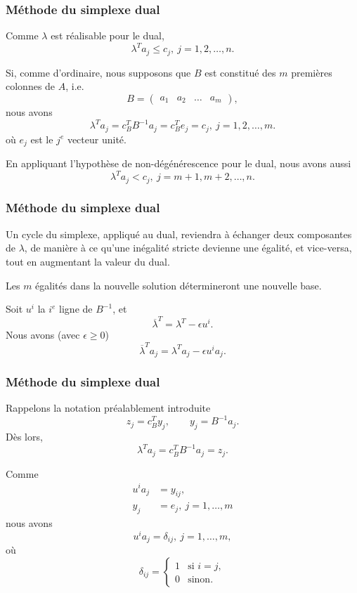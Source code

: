 \documentclass[usepdftitle=false]{beamer}
\begin{document}
\begin{frame}
	\frametitle{Méthode du simplexe dual}
	
	Comme $\lambda$ est réalisable pour le dual,
	\[
	\lambda^T a_j \leq c_j,\ j = 1, 2, \ldots, n.
	\]
	
	\mbox{}
	
	Si, comme d'ordinaire, nous supposons que $B$ est constitué des $m$ premières colonnes de $A$, i.e.
	\[
	B = \begin{pmatrix}
		a_1 & a_2 & \ldots & a_m
	\end{pmatrix},
	\]
	nous avons
	\[
	\lambda^T a_j = c_B^T B^{-1} a_j = c_B^T e_j = c_j,\ j = 1, 2, \ldots, m.
	\]
	où $e_j$ est le $j^e$ vecteur unité.
	
	\mbox{}
	
	En appliquant l'hypothèse de non-dégénérescence pour le dual, nous avons aussi
	\[
	\lambda^T a_j < c_j,\ j = m+1, m+2, \ldots, n.
	\]
	
\end{frame}

\begin{frame}
	\frametitle{Méthode du simplexe dual}
	
	Un cycle du simplexe, appliqué au dual, reviendra à échanger deux composantes de $\lambda$, de manière à ce qu'une inégalité stricte devienne une égalité, et vice-versa, tout en augmentant la valeur du dual.
	
	\mbox{}
	
	Les $m$ égalités dans la nouvelle solution détermineront une nouvelle base.
	
	\mbox{}
	
	Soit $u^i$ la $i^e$ ligne de $B^{-1}$, et
	\[
	\overline{\lambda}^T = \lambda^T - \epsilon u^i.
	\]
	Nous avons (avec $\epsilon \geq 0$)
	\[
	\overline{\lambda}^T a_j = \lambda^T a_j - \epsilon u^i a_j.
	\]
	
\end{frame}

\begin{frame}
	\frametitle{Méthode du simplexe dual}
	
	Rappelons la notation préalablement introduite
	\[
	z_j = c_B^T y_j,\qquad y_j = B^{-1}a_j.
	\]
	Dès lors,
	\[
	\lambda^T a_j = c_B^T B^{-1} a_j = z_j.
	\]
	
	\mbox{}
	
	Comme
	\begin{align*}
		u^i a_j &= y_{ij},\\
		y_j &= e_j,\ j = 1,\ldots,m
	\end{align*}
	nous avons
	\[
	u^i a_j = \delta_{ij},\ j = 1,\ldots,m,
	\]
	où
	\[
	\delta_{ij} =
	\begin{cases}
		1 & \mbox{si } i = j,\\
		0 & \mbox{sinon}.
	\end{cases}
	\]
	
\end{frame}
\end{document}
